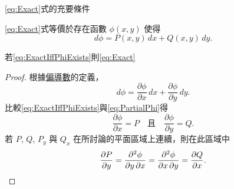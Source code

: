 \documentclass{beamer}
\newcommand{\Negskip}{\vskip -1em plus 2pt minus 2pt}
\newcommand{\negskip}{\vskip -2em plus 3pt minus 3pt}
\theoremstyle{remark}
\begin{document}
\begin{CJK}{UTF8}{bsmi}
\begin{frame}{\eqref{eq:Exact}式的充要條件}
  \begin{theorem}
    \eqref{eq:Exact}式等價於存在函數 $\phi(x,y)$ 使得
    \begin{equation}
      d\phi = P(x,y)\,dx + Q(x,y)\,dy. \label{eq:ExactIffPhiExists}
    \end{equation}
  \end{theorem}
\end{frame}


\begin{frame}{若\eqref{eq:ExactIffPhiExists}則\eqref{eq:Exact}}
  \begin{proof}
    根據\href{http://zh.wikipedia.org/wiki/\%E5\%81\%8F\%E5\%AF\%BC\%E6\%95\%B0}{偏導數}的定義，
    \begin{equation}
      d\phi = \frac{\partial\phi}{\partial x}\,dx + \frac{\partial\phi}{\partial y}\,dy. \label{eq:PartialPhi}
    \end{equation}
    比較\eqref{eq:ExactIffPhiExists}與\eqref{eq:PartialPhi}得
    \[\frac{\partial\phi}{\partial x} = P \quad \mbox{且} \quad \frac{\partial\phi}{\partial y} = Q.\]
    若 $P$, $Q$, $P_y$ 與 $Q_x$
    在所討論的平面區域上連續，則在此區域中
    \[\frac{\partial P}{\partial y} = \frac{\partial^2 \phi}{\partial y\,\partial x} = \frac{\partial^2 \phi}{\partial x\,
      \partial y} = \frac{\partial Q}{\partial x}. \qedhere\]
  \end{proof}
\end{frame}


\end{CJK}
\end{document}
